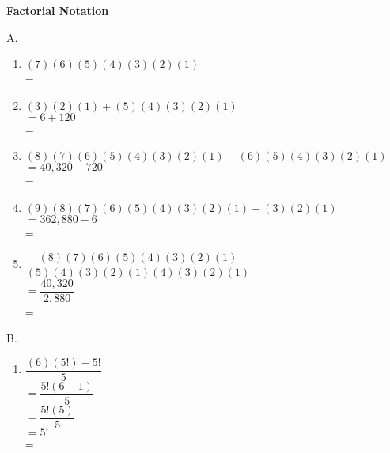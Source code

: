 \begin{center}
\textbf{Factorial Notation}\\
\end{center}

\vspace*{1ex}

\begin{multicols}{2}
A.  %

\begin{enumerate}[label = \arabic*. ]


\item %
$(7)(6)(5)(4)(3)(2)(1)$ \redcheck \\
= \redcheck 

\item %
$(3)(2)(1)+(5)(4)(3)(2)(1) $ \redcheck \\
$=6+120 $ \redcheck \\
= \redcheck 

\item%
$ (8)(7)(6)(5)(4)(3)(2)(1) - (6)(5)(4)(3)(2)(1)$ \redcheck \\
$= 40,320 - 720$ \redcheck \\
= \redcheck 

\item %
$ (9)(8)(7)(6)(5)(4)(3)(2)(1) - (3)(2)(1) $ \redcheck \\
$ = 362,880 - 6 $ \redcheck \\
= \redcheck 

\item %
$ \dfrac{(8)(7)(6)(5)(4)(3)(2)(1)}{(5)(4)(3)(2)(1)(4)(3)(2)(1)} $ \redcheck \\
$ = \dfrac{40,320}{2,880} $ \redcheck \\
= \redcheck 



\end{enumerate}  
B. %
\begin{enumerate}[label = \arabic*. ]
\item %
$ \dfrac{(6)(5!) -5!}{5} $ \redcheck \\
$ =\dfrac{5!(6-1)}{5} $ \redcheck \\
$ =\dfrac{5!(5)}{5} $ \redcheck \\
$ =5! $ \redcheck \\
= \redcheck 


\end{enumerate}
\end{multicols}
